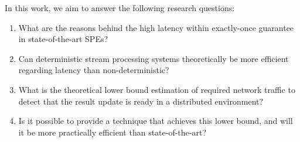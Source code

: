 \label{phd_questions}

In this work, we aim to answer the following research questions:
\begin{enumerate}
    \item What are the reasons behind the high latency within exactly-once guarantee in state-of-the-art SPEs?
    \item Can deterministic stream processing systems theoretically be more efficient regarding latency than non-deterministic? 
    \item What is the theoretical lower bound estimation of required network traffic to detect that the result update is ready in a distributed environment? 
    \item Is it possible to provide a technique that achieves this lower bound, and will it be more practically efficient than state-of-the-art? 
\end{enumerate}